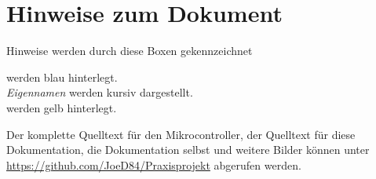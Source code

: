 \documentclass[
	11pt,					%
	DIV10,
	ngerman,					%
	a4paper,         		%
	oneside,				%
	titlepage,				%
	final					%
]{scrreprt}
\begin{document}
\setcounter{secnumdepth}{3}
\setcounter{tocdepth}{3}

\ofoot{}

%
\ofoot{\pagemark}

\tableofcontents								%

		
\label{sec:Glossar}		
\printnomenclature

\listoffigures						%
\listoftables						%
\renewcommand{\lstlistlistingname}{Codeverzeichnis}
\lstlistoflistings					%
\chapter*{Hinweise zum Dokument}
\begin{Tipp}Hinweise werden durch diese Boxen gekennzeichnet\end{Tipp}

 werden blau hinterlegt.\\

\emph{Eigennamen} werden kursiv dargestellt.\\

 werden gelb hinterlegt.\\

\lstset{language=C, basicstyle=\footnotesize, showstringspaces=false, tabsize=8}

Der komplette Quelltext für den Mikrocontroller, der Quelltext für diese Dokumentation, die Dokumentation selbst und weitere Bilder können unter \url{https://github.com/JoeD84/Praxisprojekt} abgerufen werden.
\clearpage
{}
\end{document}
